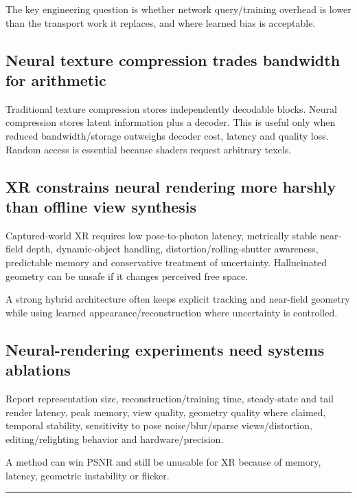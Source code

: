 The key engineering question is whether network query/training overhead is lower than the transport work it replaces, and where learned bias is acceptable.

\subsection{Neural texture compression trades bandwidth for arithmetic}\label{neural-texture-compression-trades-bandwidth-for-arithmetic}

Traditional texture compression stores independently decodable blocks. Neural compression stores latent information plus a decoder. This is useful only when reduced bandwidth/storage outweighs decoder cost, latency and quality loss. Random access is essential because shaders request arbitrary texels.

\subsection{XR constrains neural rendering more harshly than offline view synthesis}\label{xr-constrains-neural-rendering-more-harshly-than-offline-view-synthesis}

Captured-world XR requires low pose-to-photon latency, metrically stable near-field depth, dynamic-object handling, distortion/rolling-shutter awareness, predictable memory and conservative treatment of uncertainty. Hallucinated geometry can be unsafe if it changes perceived free space.

A strong hybrid architecture often keeps explicit tracking and near-field geometry while using learned appearance/reconstruction where uncertainty is controlled.

\subsection{Neural-rendering experiments need systems ablations}\label{neural-rendering-experiments-need-systems-ablations}

Report representation size, reconstruction/training time, steady-state and tail render latency, peak memory, view quality, geometry quality where claimed, temporal stability, sensitivity to pose noise/blur/sparse views/distortion, editing/relighting behavior and hardware/precision.

A method can win PSNR and still be unusable for XR because of memory, latency, geometric instability or flicker.

\begin{center}\rule{0.5\linewidth}{0.5pt}\end{center}

